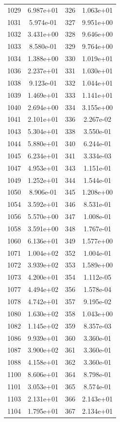 \documentclass[12pt]{article}
\begin{document}
\begin{longtable}{@{}cccc@{}}
1029 & 6.987e+01 & 326 & 1.063e+01 \\
1031 & 5.974e-01 & 327 & 9.951e+00 \\
1032 & 3.431e+00 & 328 & 9.646e+00 \\
1033 & 8.580e-01 & 329 & 9.764e+00 \\
1034 & 1.388e+00 & 330 & 1.019e+01 \\
1036 & 2.237e+01 & 331 & 1.030e+01 \\
1038 & 9.123e-01 & 332 & 1.044e+01 \\
1039 & 1.469e+01 & 333 & 1.141e+01 \\
1040 & 2.694e+00 & 334 & 3.155e+00 \\
1041 & 2.101e+01 & 336 & 2.267e-02 \\
1043 & 5.304e+01 & 338 & 3.550e-01 \\
1044 & 5.880e+01 & 340 & 6.244e-01 \\
1045 & 6.234e+01 & 341 & 3.334e-03 \\
1047 & 4.953e+01 & 343 & 1.151e-01 \\
1049 & 1.252e+01 & 344 & 1.544e-01 \\
1050 & 8.906e-01 & 345 & 1.208e+00 \\
1054 & 3.592e+01 & 346 & 8.531e-01 \\
1056 & 5.570e+00 & 347 & 1.008e-01 \\
1058 & 3.591e+00 & 348 & 1.767e-01 \\
1060 & 6.136e+01 & 349 & 1.577e+00 \\
1071 & 1.004e+02 & 352 & 1.004e-01 \\
1072 & 3.939e+02 & 353 & 1.589e+00 \\
1073 & 4.200e+01 & 354 & 1.112e-05 \\
1077 & 4.494e+02 & 356 & 1.578e-04 \\
1078 & 4.742e+01 & 357 & 9.195e-02 \\
1080 & 1.630e+02 & 358 & 1.043e+00 \\
1082 & 1.145e+02 & 359 & 8.357e-03 \\
1086 & 9.939e+01 & 360 & 3.360e-01 \\
1087 & 3.900e+02 & 361 & 3.360e-01 \\
1088 & 4.158e+01 & 362 & 3.360e-01 \\
1100 & 8.606e+01 & 364 & 8.798e-01 \\
1101 & 3.053e+01 & 365 & 8.574e-01 \\
1103 & 2.131e+01 & 366 & 2.143e+01 \\
1104 & 1.795e+01 & 367 & 2.134e+01 \\

\end{longtable}
\end{document}

